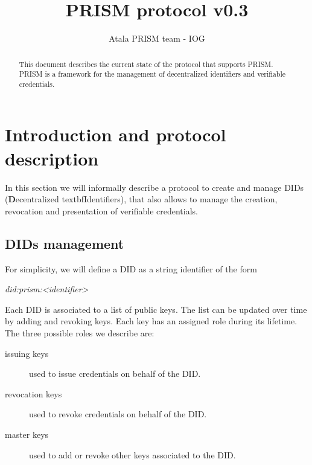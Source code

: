 \documentclass[10pt,a4paper]{article}
\title{PRISM protocol v0.3}
\author{Atala PRISM team - IOG}
\date{}
\begin{document}
\maketitle 

\begin{abstract} 
This document describes the current state of the protocol that supports PRISM. PRISM is a framework for the management of decentralized identifiers and verifiable credentials. 
\end{abstract}

\setcounter{tocdepth}{3} 

\tableofcontents 
\newpage 


\section{Introduction and protocol description}

In this section we will informally describe a protocol to create and manage DIDs (\textbf{D}ecentralized textbf{Id}entifiers), that also allows to manage the creation, revocation and presentation of verifiable credentials.

\subsection{DIDs management}

For simplicity, we will define a DID as a string identifier of the form 

\begin{center}
	\emph{did:prism:<identifier>}
\end{center}

Each DID is associated to a list of public keys. The list can be updated over time by adding and revoking keys. Each key has an assigned role during its lifetime. The three possible roles we describe are:

\begin{description}
\item[issuing keys] used to issue credentials on behalf of the DID.
\item[revocation keys] used to revoke credentials on behalf of the DID.
\item[master keys] used to add or revoke other keys associated to the DID.
\end{description}
\end{document}
